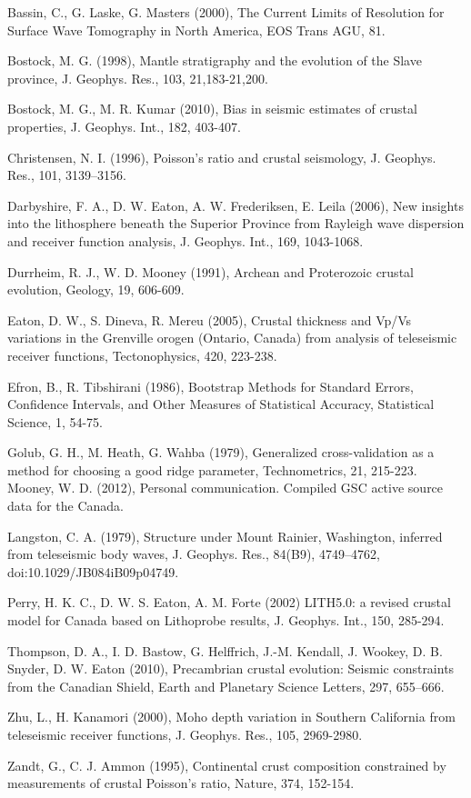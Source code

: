 \documentclass[draft, 12pt]{article}
\begin{document}


\begin{bibliography}
Bassin, C., G. Laske, G. Masters (2000), The Current Limits of Resolution for Surface Wave Tomography in North America, EOS Trans AGU, 81.

Bostock, M. G. (1998), Mantle stratigraphy and the evolution of the Slave province, J. Geophys. Res., 103, 21,183-21,200.

Bostock, M. G., M. R. Kumar (2010), Bias in seismic estimates of crustal properties, J. Geophys. Int., 182, 403-407.

Christensen, N. I. (1996), Poisson's ratio and crustal seismology, J. Geophys. Res., 101, 3139–3156.

Darbyshire, F. A., D. W. Eaton, A. W. Frederiksen, E. Leila (2006), New insights into the lithosphere beneath the Superior Province from Rayleigh wave dispersion and receiver function analysis, J. Geophys. Int., 169, 1043-1068.

Durrheim, R. J., W. D. Mooney (1991), Archean and Proterozoic crustal evolution, Geology, 19, 606-609.

Eaton, D. W., S. Dineva, R. Mereu (2005), Crustal thickness and Vp/Vs variations in the Grenville orogen (Ontario, Canada) from analysis of teleseismic receiver functions, Tectonophysics, 420, 223-238.

Efron, B., R. Tibshirani (1986), Bootstrap Methods for Standard Errors, Confidence Intervals, and Other Measures of Statistical Accuracy, Statistical Science, 1, 54-75.

Golub, G. H., M. Heath, G. Wahba (1979), Generalized cross-validation as a method for choosing a good ridge parameter, Technometrics, 21, 215-223.
Mooney, W. D. (2012), Personal communication. Compiled GSC active source data for the Canada.

Langston, C. A. (1979), Structure under Mount Rainier, Washington, inferred from teleseismic body waves, J. Geophys. Res., 84(B9), 4749–4762, doi:10.1029/JB084iB09p04749.

Perry, H. K. C., D. W. S. Eaton, A. M. Forte (2002) LITH5.0: a revised crustal model for Canada based on Lithoprobe results,  J. Geophys. Int., 150, 285-294.

Thompson, D. A., I. D. Bastow, G. Helffrich, J.-M. Kendall, J. Wookey, D. B. Snyder, D. W. Eaton (2010), Precambrian crustal evolution: Seismic constraints from the Canadian Shield, Earth and Planetary Science Letters, 297, 655–666.

Zhu, L., H. Kanamori (2000), Moho depth variation in Southern California from teleseismic receiver functions, J. Geophys. Res., 105, 2969-2980.

Zandt, G., C. J. Ammon (1995), Continental crust composition constrained by measurements of crustal Poisson's ratio, Nature, 374, 152-154.

\end{bibliography}
\end{document}
